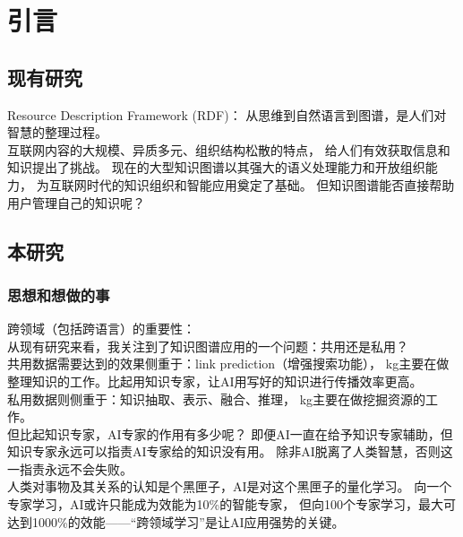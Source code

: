 \documentclass[12pt]{ctexart}
\theoremstyle{definition}
\begin{document}
\section{引言}
\subsection{现有研究}
Resource Description Framework (RDF)：
从思维到自然语言到图谱，是人们对智慧的整理过程。\\
互联网内容的大规模、异质多元、组织结构松散的特点，
给人们有效获取信息和知识提出了挑战。
现在的大型知识图谱以其强大的语义处理能力和开放组织能力，
为互联网时代的知识组织和智能应用奠定了基础。
但知识图谱能否直接帮助用户管理自己的知识呢？

\subsection{本研究}
\subsubsection{思想和想做的事}
跨领域（包括跨语言）的重要性：\\
从现有研究来看，我关注到了知识图谱应用的一个问题：共用还是私用？\\
共用数据需要达到的效果侧重于：link prediction（增强搜索功能），
kg主要在做整理知识的工作。比起用知识专家，让AI用写好的知识进行传播效率更高。\\
私用数据则侧重于：知识抽取、表示、融合、推理，
kg主要在做挖掘资源的工作。\\
但比起知识专家，AI专家的作用有多少呢？
即便AI一直在给予知识专家辅助，但知识专家永远可以指责AI专家给的知识没有用。
除非AI脱离了人类智慧，否则这一指责永远不会失败。\\
人类对事物及其关系的认知是个黑匣子，AI是对这个黑匣子的量化学习。
向一个专家学习，AI或许只能成为效能为10\%的智能专家，
但向100个专家学习，最大可达到1000\%的效能——“跨领域学习”是让AI应用强势的关键。\\
\end{document}
